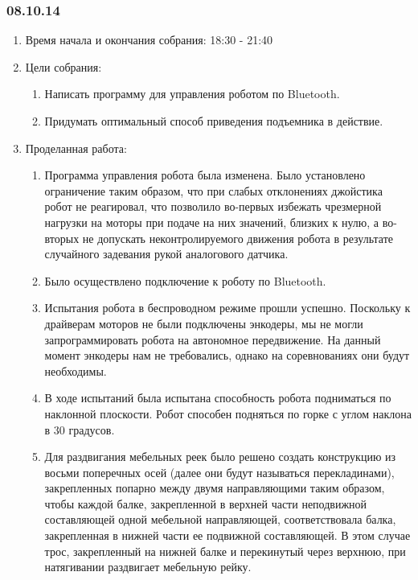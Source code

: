 
\subsubsection{08.10.14}

\begin{enumerate}
	\item Время начала и окончания собрания:
	18:30 - 21:40
	\item Цели собрания:
	\begin{enumerate}
	  \item Написать программу для управления роботом по Bluetooth.
	  
	  \item Придумать оптимальный способ приведения подъемника в действие.
	  
    \end{enumerate}
	\item Проделанная работа:
	\begin{enumerate}
	  \item Программа управления робота была изменена. Было установлено ограничение таким образом, что при слабых отклонениях джойстика робот не реагировал, что позволило во-первых избежать чрезмерной нагрузки на моторы при подаче на них значений, близких к нулю, а во-вторых не допускать неконтролируемого движения робота в результате случайного задевания рукой аналогового датчика.
      
      \item Было осуществлено подключение к роботу по Bluetooth.
      
      \item	Испытания робота в беспроводном режиме прошли успешно. Поскольку к драйверам моторов не были подключены энкодеры, мы не могли запрограммировать робота на автономное передвижение. На данный момент энкодеры нам не требовались, однако на соревнованиях они будут необходимы.
      
      \item В ходе испытаний была испытана способность робота подниматься по наклонной плоскости. Робот  способен подняться по горке с углом наклона в 30 градусов.
       
      \item Для раздвигания мебельных реек было решено создать конструкцию из восьми поперечных осей (далее они будут называться перекладинами), закрепленных попарно между двумя направляющими таким образом, чтобы каждой балке, закрепленной в верхней части неподвижной составляющей одной мебельной направляющей, соответствовала балка, закрепленная в нижней части ее подвижной составляющей. В этом случае трос, закрепленный на нижней балке и перекинутый через верхнюю, при натягивании раздвигает мебельную рейку.
      

\end{enumerate}
\end{enumerate}
